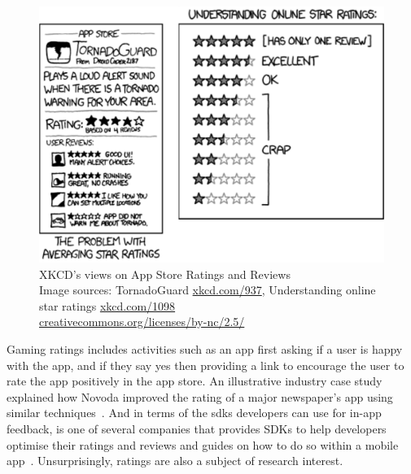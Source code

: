 \begin{figure}
    \centering
    \includegraphics[width=\linewidth]{images/xkcd/xkcd-combined.pdf}
    \caption{XKCD's views on App Store Ratings and Reviews \\{\footnotesize Image sources: TornadoGuard \href{https://xkcd.com/937}{xkcd.com/937}, Understanding online star ratings \href{https://xkcd.com/1098}{xkcd.com/1098} \\ \href{https://creativecommons.org/licenses/by-nc/2.5/}{creativecommons.org/licenses/by-nc/2.5/}}}
    \label{fig:xkcd-app-store-ratings}
\end{figure}


Gaming ratings includes activities such as an app first asking if a user is happy with the app, and if they say yes then providing a link to encourage the user to rate the app positively in the app store.  An illustrative industry case study explained how Novoda improved the rating of a major newspaper's app using similar techniques~. And in terms of the \Glspl{sdk} developers can use for in-app feedback,  is one of several companies that provides SDKs to help developers optimise their ratings and reviews and guides on how to do so within a mobile app~. Unsurprisingly, ratings are also a subject of research interest.

